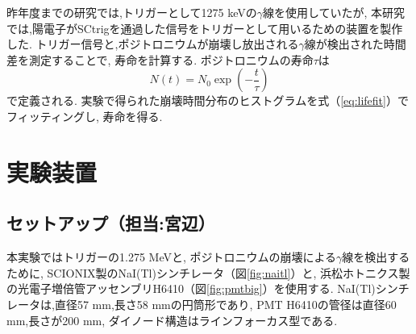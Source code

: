 昨年度までの研究では,トリガーとして1275 keVの$\gamma$線を使用していたが,
本研究では,陽電子がSCtrigを通過した信号をトリガーとして用いるための装置を製作した.
トリガー信号と,ポジトロニウムが崩壊し放出される$\gamma$線が検出された時間差を測定することで,
寿命を計算する.
ポジトロニウムの寿命$\tau$は
\begin{equation}
N(t) = N_{0} \exp( - \frac{t}{\tau})
\label{eq:lifefit}
\end{equation}
で定義される.
実験で得られた崩壊時間分布のヒストグラムを式（\ref{eq:lifefit}）でフィッティングし,
寿命を得る.


\section{実験装置}\label{apparatus_overview}

\subsection{セットアップ（担当:宮辺）}

本実験ではトリガーの1.275 MeVと,
ポジトロニウムの崩壊による$\gamma$線を検出するために,
SCIONIX製のNaI(Tl)シンチレータ（図\ref{fig:naitl}）と,
浜松ホトニクス製の光電子増倍管アッセンブリH6410（図\ref{fig:pmtbig}）を使用する.
NaI(Tl)シンチレータは,直径57 mm,長さ58 mmの円筒形であり,
PMT H6410の管径は直径60 mm,長さが200 mm,
ダイノード構造はラインフォーカス型である.

